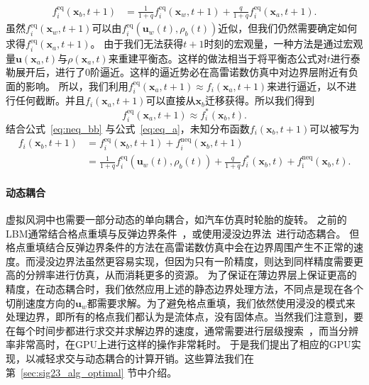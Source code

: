 \begin{align}
f^\text{eq}_i(\bm{x}_b, t\!+\!1) &= \frac{1}{1+q}f^\text{eq}_{i}(\bm{x}_w, t\!+\!1) + \frac{q}{1+q}f^\text{eq}_{i}(\bm{x}_a, t\!+\!1).
\end{align}
虽然$f^\text{eq}_{i}(\bm{x}_w, t\!+\!1)$可以由$f_{i}^\text{eq}(\bm{u}_w(t), \rho_b(t))$近似，但我们仍然需要确定如何求得$f^\text{eq}_{i}(\bm{x}_a, t\!+\!1)$。
由于我们无法获得$t+1$时刻的宏观量，一种方法是通过宏观量$\bm{u}(\bm{x}_a, t)$与$\rho(\bm{x}_a, t)$来重建平衡态。这样的做法相当于将平衡态公式对$t$进行泰勒展开后，进行了0阶逼近。这样的逼近势必在高雷诺数仿真中对边界层附近有负面的影响。
所以，我们利用$f^\text{eq}_{i}(\bm{x}_a, t\!+\!1) \approx f_{i}(\bm{x}_a, t\!+\!1)$来进行逼近，以不进行任何截断。并且$f_{i}(\bm{x}_a, t\!+\!1)$可以直接从$\bm{x}_b$迁移获得。所以我们得到
\begin{equation}
\label{eq:eq_a}
f^\text{eq}_{i}(\bm{x}_a, t\!+\!1) \approx f^{*}_{i}(\bm{x}_b, t).
\end{equation}
结合公式~\ref{eq:neq_bb} 与公式~\ref{eq:eq_a}，未知分布函数$f_i(\bm{x}_b, t\!+\!1)$可以被写为
\begin{align}
f_i(\bm{x}_b, t\!+\!1) &= f^\text{eq}_i(\bm{x}_b, t\!+\!1) + f^\text{neq}_{i}(\bm{x}_b, t\!+\!1) \\
&= \frac{1}{1\!+\!q}f_{i}^\text{eq}(\bm{u}_w(t), \rho_b(t)) + \frac{q}{1\!+\!q}f^{*}_{i}(\bm{x}_b, t) + f^\text{neq}_{\bar{\imath}}(\bm{x}_b, t).\nonumber
\end{align}

\paragraph{动态耦合}
虚拟风洞中也需要一部分动态的单向耦合，如汽车仿真时轮胎的旋转。
之前的LBM通常结合格点重填与反弹边界条件~\cite{Tao-2016}，或使用浸没边界法~\cite{Li-2016, Li-2020}进行动态耦合。
但格点重填结合反弹边界条件的方法在高雷诺数仿真中会在边界周围产生不正常的速度。而浸没边界法虽然更容易实现，但因为只有一阶精度，则达到同样精度需要更高的分辨率进行仿真，从而消耗更多的资源。
为了保证在薄边界层上保证更高的精度，在动态耦合时，我们依然应用上述的静态边界处理方法，不同点是现在各个切削速度方向的$\bm{u}_w$都需要求解。为了避免格点重填，我们依然使用浸没的模式来处理边界，即所有的格点我们都认为是流体点，没有固体点。当然我们注意到，要在每个时间步都进行求交并求解边界的速度，通常需要进行层级搜索~\cite{Karras-2012}，而当分辨率非常高时，在GPU上进行这样的操作非常耗时。
于是我们提出了相应的GPU实现，以减轻求交与动态耦合的计算开销。这些算法我们在第~\ref{sec:sig23_alg_optimal} 节中介绍。

